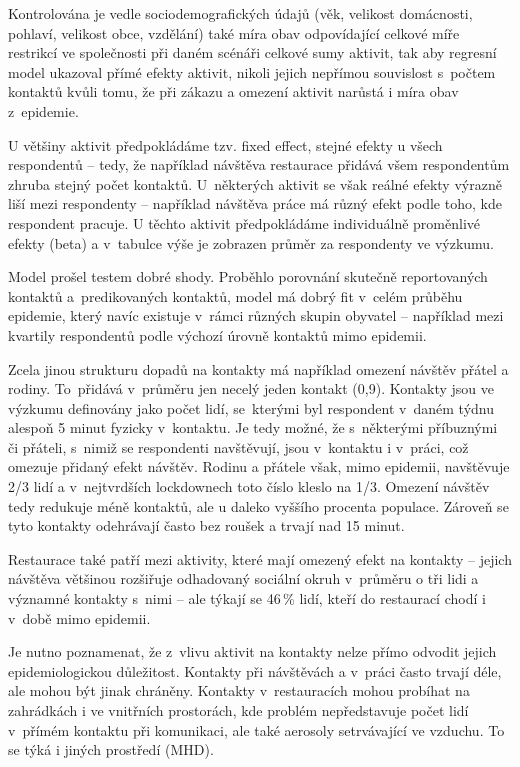 Kontrolována je vedle sociodemografických údajů (věk, velikost domácnosti, pohlaví, velikost obce, vzdělání) také míra obav odpovídající celkové míře restrikcí ve společnosti při daném scénáři celkové sumy aktivit, tak aby regresní model ukazoval přímé efekty aktivit, nikoli jejich nepřímou souvislost s počtem kontaktů kvůli tomu, že při zákazu a omezení aktivit narůstá i míra obav z epidemie.

U většiny aktivit předpokládáme tzv. fixed effect, stejné efekty u všech respondentů – tedy, že například návštěva restaurace přidává všem respondentům zhruba stejný počet kontaktů. U některých aktivit se však reálné efekty výrazně liší mezi respondenty – například návštěva práce má různý efekt podle toho, kde respondent pracuje. U těchto aktivit předpokládáme individuálně proměnlivé efekty (beta) a v tabulce výše je zobrazen průměr za respondenty ve výzkumu.

Model prošel testem dobré shody. Proběhlo porovnání skutečně reportovaných kontaktů a predikovaných kontaktů, model má dobrý fit v celém průběhu epidemie, který navíc existuje v rámci různých skupin obyvatel – například mezi kvartily respondentů podle výchozí úrovně kontaktů mimo epidemii.
\vspace{1em}

Zcela jinou strukturu dopadů na kontakty má například omezení návštěv přátel a rodiny. To přidává v průměru jen necelý jeden kontakt (0,9). Kontakty jsou ve výzkumu definovány jako počet lidí, se kterými byl respondent v daném týdnu alespoň 5 minut fyzicky v kontaktu. Je tedy možné, že s některými příbuznými či přáteli, s nimiž se respondenti navštěvují, jsou v kontaktu i v práci, což omezuje přidaný efekt návštěv. Rodinu a přátele však, mimo epidemii, navštěvuje 2/3 lidí a v nejtvrdších lockdownech toto číslo kleslo na 1/3. Omezení návštěv tedy redukuje méně kontaktů, ale u daleko vyššího procenta populace. Zároveň se tyto kontakty odehrávají často bez roušek a trvají nad 15 minut. 

Restaurace také patří mezi aktivity, které mají omezený efekt na kontakty – jejich návštěva většinou rozšiřuje odhadovaný sociální okruh v průměru o tři lidi a významné kontakty s nimi – ale týkají se 46\,\% lidí, kteří do restaurací chodí i v době mimo epidemii. 

Je nutno poznamenat, že z vlivu aktivit na kontakty nelze přímo odvodit jejich epidemiologickou důležitost. Kontakty při návštěvách a v práci často trvají déle, ale mohou být jinak chráněny. Kontakty v restauracích mohou probíhat na zahrádkách i ve vnitřních prostorách, kde problém nepředstavuje počet lidí v přímém kontaktu při komunikaci, ale také aerosoly setrvávající ve vzduchu. To se týká i jiných prostředí (MHD). 


